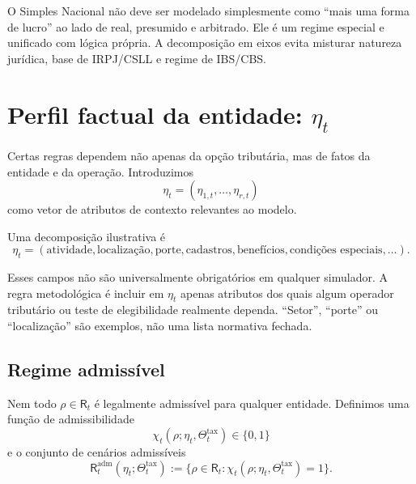 \documentclass[11pt,a4paper]{article}
\begin{document}
\begin{cuidado}
O Simples Nacional não deve ser modelado simplesmente como ``mais uma forma de lucro'' ao lado de real, presumido e arbitrado. Ele é um regime especial e unificado com lógica própria. A decomposição em eixos evita misturar natureza jurídica, base de IRPJ/CSLL e regime de IBS/CBS.
\end{cuidado}

\section{Perfil factual da entidade: $\eta_t$}

Certas regras dependem não apenas da opção tributária, mas de fatos da entidade e da operação. Introduzimos
\begin{equation}
\boxed{
\eta_t=
(\eta_{1,t},\ldots,\eta_{r,t})
}
\label{eq:eta}
\end{equation}
como vetor de atributos de contexto relevantes ao modelo.

Uma decomposição ilustrativa é
\begin{equation}
\eta_t=
(\text{atividade},\text{localização},\text{porte},\text{cadastros},
\text{benefícios},\text{condições especiais},\ldots).
\end{equation}

\begin{cuidado}
Esses campos não são universalmente obrigatórios em qualquer simulador. A regra metodológica é incluir em $\eta_t$ apenas atributos dos quais algum operador tributário ou teste de elegibilidade realmente dependa. ``Setor'', ``porte'' ou ``localização'' são exemplos, não uma lista normativa fechada.
\end{cuidado}

\subsection{Regime admissível}

Nem todo $\rho\in\mathsf R_t$ é legalmente admissível para qualquer entidade. Definimos uma função de admissibilidade
\begin{equation}
\boxed{
\chi_t(\rho;\eta_t,\Theta_t^{\mathrm{tax}})\in\{0,1\}
}
\label{eq:chi}
\end{equation}
e o conjunto de cenários admissíveis
\begin{equation}
\boxed{
\mathsf R_t^{\mathrm{adm}}(\eta_t;\Theta_t^{\mathrm{tax}})
:=\{\rho\in\mathsf R_t:\chi_t(\rho;\eta_t,\Theta_t^{\mathrm{tax}})=1\}.
}
\label{eq:r-adm}
\end{equation}
\end{document}

